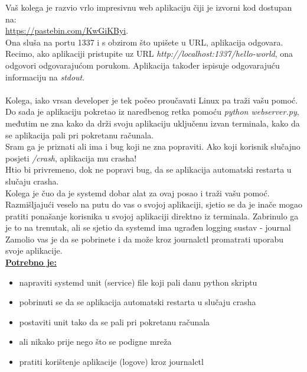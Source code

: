 \documentclass[12pt,a4paper]{article}
\begin{document}
Vaš kolega je razvio vrlo impresivnu web aplikaciju čiji je izvorni kod dostupan na: \\ \url{https://pastebin.com/KwGiKByi}. \\
Ona sluša na portu 1337 i s obzirom što upišete u URL, aplikacija odgovara. \\
Recimo, ako aplikaciji pristupite uz URL \textit{http://localhost:1337/hello-world}, ona odgovori odgovarajućom porukom.
Aplikacija također ispisuje odgovarajuću informaciju na \textit{stdout}. \\
\\
Kolega, iako vrsan developer je tek počeo proučavati Linux pa traži vašu pomoć.
Do sada je aplikaciju pokretao iz naredbenog retka pomoću \textit{python webserver.py},
međutim ne zna kako da drži svoju aplikaciju uključenu izvan terminala, kako da se aplikacija pali pri pokretanu računala. \\
Sram ga je priznati ali ima i bug koji ne zna popraviti. Ako koji korisnik slučajno posjeti \textit{/crash}, aplikacija mu crasha! \\
Htio bi privremeno, dok ne popravi bug, da se aplikacija automatski restarta u slučaju crasha. \\
Kolega je čuo da je systemd dobar alat za ovaj posao i traži vašu pomoć. \\
Razmišljajući veselo na putu do vas o svojoj aplikaciji, sjetio se da je inače mogao pratiti ponašanje korisnika u svojoj aplikaciji direktno iz terminala.
Zabrinulo ga je to na trenutak, ali se sjetio da systemd ima ugrađen logging sustav - journal \\
Zamolio vas je da se pobrinete i da može kroz journalctl promatrati uporabu svoje aplikacije. \\

\underline{\textbf{Potrebno je:}}
\begin{itemize}
	\item napraviti systemd unit (service) file koji pali danu python skriptu
	\item pobrinuti se da se aplikacija automatski restarta u slučaju crasha
	\item postaviti unit tako da se pali pri pokretanu računala
  \item ali nikako prije nego što se podigne mreža
	\item pratiti korištenje aplikacije (logove) kroz journalctl
\end{itemize}


\newpage
\end{document}
